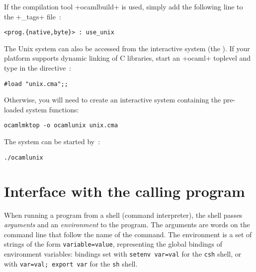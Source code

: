 If the compilation tool  \ml+ocamlbuild+ is used, simply add the
following line to the 
\ml+_tags+ file~:
%
\begin{lstlisting}
<prog.{native,byte}> : use_unix
\end{lstlisting}
%
The Unix system can also be accessed from the interactive system (the
). If your platform supports dynamic linking of C
libraries, start an \ml+ocaml+ toplevel and type in the directive~:
%
\begin{lstlisting}
#load "unix.cma";;
\end{lstlisting}
%
Otherwise, you will need to create an interactive system containing
the pre-loaded system functions:
%
\begin{lstlisting}
ocamlmktop -o ocamlunix unix.cma
\end{lstlisting}
%
The system can be started by~:
\begin{lstlisting}
./ocamlunix
\end{lstlisting}

\section{Interface with the calling program}

When running a program from a shell (command interpreter), the shell
passes \emph{arguments} and an \emph{environment} to the program.  The
arguments are words on the command line that follow the name of the
command. The environment is a set of strings of the form
\texttt{variable=value}, representing the global bindings of environment
variables: bindings set with \texttt{setenv var=val} for the
\texttt{csh} shell, or with \texttt{var=val; export var} for
the \texttt{sh} shell.

